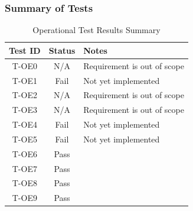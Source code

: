 \documentclass[12pt, titlepage]{article}
\begin{document}
\subsubsection{Summary of Tests}
\begin{table}[H]
    \centering
    \begin{tabular}{|c|c|l|}
        \hline
        \textbf{Test ID} & \textbf{Status} & \textbf{Notes}\\
        \hline
        T-OE0 & N/A & Requirement is out of scope\\
        T-OE1 & Fail & Not yet implemented\\
        T-OE2 & N/A & Requirement is out of scope \\
        T-OE3 & N/A & Requirement is out of scope \\
        T-OE4 & Fail & Not yet implemented \\
        T-OE5 & Fail & Not yet implemented \\
        T-OE6 & Pass & \\
        T-OE7 & Pass & \\
        T-OE8 & Pass & \\
        T-OE9 & Pass & \\
        \hline
    \end{tabular}
    \caption{Operational Test Results Summary}
\end{table}
\end{document}
